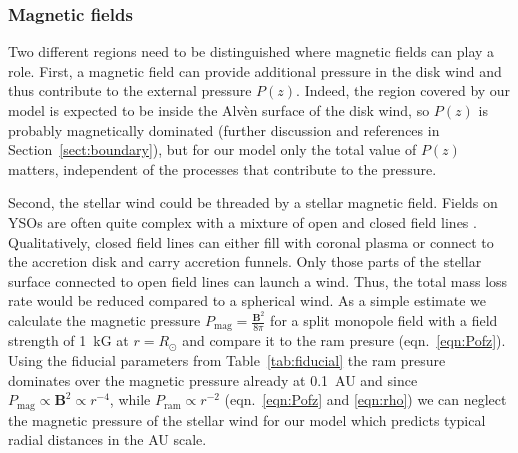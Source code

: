 \subsubsection{Magnetic fields}
Two different regions need to be distinguished where magnetic fields can play a role. First, a magnetic field can provide additional pressure in the disk wind and thus contribute to the external pressure $P(z)$. Indeed, the region covered by our model is expected to be inside the Alv\`en surface of the disk wind, so $P(z)$ is probably magnetically dominated (further discussion and references in Section~\ref{sect:boundary}), but for our model only the total value of $P(z)$ matters, independent of the processes that contribute to the pressure. 

Second, the stellar wind could be threaded by a stellar magnetic field. Fields on YSOs are often quite complex with a mixture of open and closed field lines \citep[e.g.][]{2011MNRAS.417..472D,2012MNRAS.425.2948D}.
Qualitatively, closed field lines can either fill with coronal plasma or connect to the accretion disk and carry accretion funnels. Only those parts of the stellar surface connected to open field lines can launch a wind. Thus, the total mass loss rate would be reduced compared to a spherical wind. 
As a simple estimate we calculate the magnetic pressure $P_{\textrm{mag}}=\frac{\boldsymbol{B}^2}{8 \pi}$ for a split monopole field with a field strength of 1~kG at $r=R_\odot$ and compare it to the ram presure (eqn.~\ref{eqn:Pofz}). Using the fiducial parameters from Table~\ref{tab:fiducial} the ram presure dominates over the magnetic pressure already at 0.1~AU and since $P_{\textrm{mag}} \propto \boldsymbol{B}^2 \propto r^{-4}$, while $P_{\textrm{ram}} \propto r^{-2}$ (eqn.~\ref{eqn:Pofz} and \ref{eqn:rho}) we can neglect the magnetic pressure of the stellar wind for our model which predicts typical radial distances in the AU scale.



